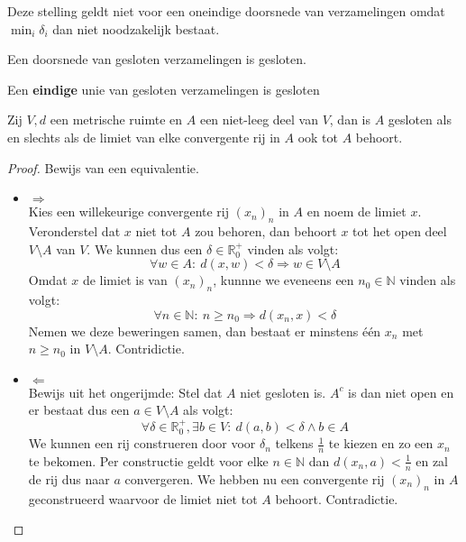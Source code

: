 \documentclass[main.tex]{subfiles}
\begin{document}
\begin{opm}
  Deze stelling geldt niet voor een oneindige doorsnede van verzamelingen omdat $\min_{i}\delta_{i}$ dan niet noodzakelijk bestaat.
\end{opm}

\begin{pr}
  Een doorsnede van gesloten verzamelingen is gesloten.
\end{pr}

\begin{pr}
  Een \textbf{eindige} unie van gesloten verzamelingen is gesloten
\end{pr}

\begin{pr}
  Zij $V,d$ een metrische ruimte en $A$ een niet-leeg deel van $V$, dan is $A$ gesloten als en slechts als de limiet van elke convergente rij in $A$ ook tot $A$ behoort.

  \begin{proof}
    Bewijs van een equivalentie.
    \begin{itemize}
    \item $\Rightarrow$\\
      Kies een willekeurige convergente rij $(x_{n})_{n}$ in $A$ en noem de limiet $x$.
      Veronderstel dat $x$ niet tot $A$ zou behoren, dan behoort $x$ tot het open deel $V \setminus A$ van $V$.
      We kunnen dus een $\delta \in \mathbb{R}_{0}^{+}$ vinden als volgt:
      \[ \forall w \in A:\ d(x,w) < \delta \Rightarrow w \in V \setminus A \]
      Omdat $x$ de limiet is van $(x_{n})_{n}$, kunnne we eveneens een $n_{0}\in \mathbb{N}$ vinden als volgt:
      \[ \forall n\in \mathbb{N}:\ n \ge n_{0} \Rightarrow d(x_{n},x) < \delta \]
      Nemen we deze beweringen samen, dan bestaat er minstens \'e\'en $x_{n}$ met $n\ge n_{0}$ in $V \setminus A$.
      Contridictie.
    \item $\Leftarrow$\\
      Bewijs uit het ongerijmde: Stel dat $A$ niet gesloten is.
      $A^{c}$ is dan niet open en er bestaat dus een $a\in V \setminus A$ als volgt:
      \[ \forall \delta \in \mathbb{R}_{0}^{+}, \exists b\in V:\ d(a,b) < \delta \wedge b \in A \]
      We kunnen een rij construeren door voor $\delta_{n}$ telkens $\frac{1}{n}$ te kiezen en zo een $x_{n}$ te bekomen.
      Per constructie geldt voor elke $n\in \mathbb{N}$ dan $d(x_{n},a) < \frac{1}{n}$ en zal de rij dus naar $a$ convergeren.
      We hebben nu een convergente rij $(x_{n})_{n}$ in $A$ geconstrueerd waarvoor de limiet niet tot $A$ behoort.
      Contradictie.
    \end{itemize}
  \end{proof}
\end{pr}
 
\end{document}
